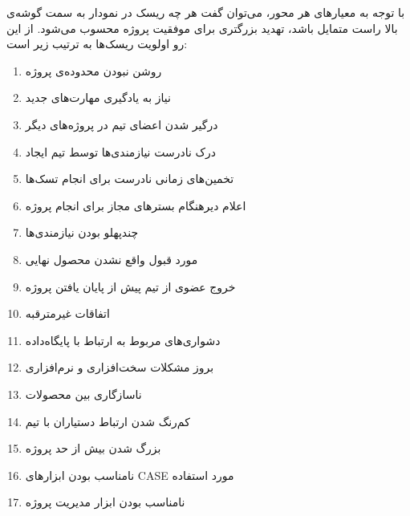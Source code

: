 با توجه به معیارهای هر محور، می‌توان گفت هر چه ریسک در نمودار به سمت گوشه‌ی بالا راست متمایل باشد، تهدید بزرگتری برای موفقیت پروژه محسوب می‌شود. از این رو اولویت ریسک‌ها به ترتیب زیر است:\\
\begin{enumerate}
	\item روشن نبودن محدوده‌ی پروژه
	\item نیاز به یادگیری مهارت‌های جدید
	\item درگیر شدن اعضای تیم در پروژه‌های دیگر
	\item درک نادرست نیازمندی‌ها توسط تیم ایجاد
	\item تخمین‌های زمانی نادرست برای انجام تسک‌ها
	\item اعلام دیرهنگام بسترهای مجاز برای انجام پروژه
	\item چندپهلو بودن نیازمندی‌ها
	\item مورد قبول واقع نشدن محصول نهایی
	\item خروج عضوی از تیم پیش از پایان یافتن پروژه
	\item اتفاقات غیرمترقبه
	\item دشواری‌های مربوط به ارتباط با پایگاه‌داده
	\item بروز مشکلات سخت‌افزاری و نرم‌افزاری
	\item ناسازگاری بین محصولات
	\item کم‌رنگ شدن ارتباط دستیاران با تیم
	\item بزرگ شدن بیش از حد پروژه
	\item نامناسب بودن ابزارهای CASE مورد استفاده
	\item نامناسب بودن ابزار مدیریت پروژه
\end{enumerate}
